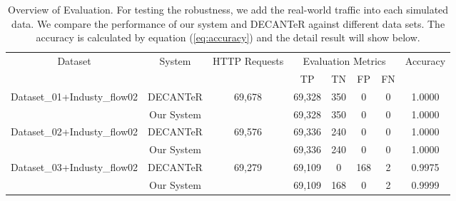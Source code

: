 \begin{table*}[!h]
\centering
\caption{Overview of Evaluation.
For testing the robustness, we add the real-world traffic into each simulated data. We compare the performance of our system and DECANTeR\cite{bortolameotti2017decanter} against different data sets. The accuracy is calculated by equation (\ref{eq:accuracy}) and the detail result will show below.}
\label{tbl:db_03}
\begin{tabular}{|c|c|c|c|c|c|c|c|}
\hline\hline
\multirow{2}{*}{Dataset}     & \multirow{2}{*}{System} & \multirow{2}{*}{HTTP Requests} & \multicolumn{4}{c|}{Evaluation Metrics} & \multirow{2}{*}{Accuracy} \\ \cline{4-7}
                             &                         &                                & TP       & TN       & FP       & FN     &                           \\ \hline
\multirow{2}{*}{Dataset\_01+Industy\_flow02} & DECANTeR \cite{bortolameotti2017decanter}                & \multirow{2}{*}{69,678}          & 69,328      & 350      & 0       & 0      & 1.0000                     \\ \cline{2-2} \cline{4-8} 
                             & Our System              &                                & 69,328       & 350      & 0       & 0      & 1.0000                    \\ \hline
\multirow{2}{*}{Dataset\_02+Industy\_flow02} & DECANTeR \cite{bortolameotti2017decanter}                & \multirow{2}{*}{69,576}          & 69,336      & 240      & 0       & 0      & 1.0000                     \\ \cline{2-2} \cline{4-8} 
                             & Our System              &                                & 69,336     & 240      & 0       & 0      & 1.0000                     \\ \hline
\multirow{2}{*}{Dataset\_03+Industy\_flow02} & DECANTeR \cite{bortolameotti2017decanter}                & \multirow{2}{*}{69,279}          & 69,109      & 0        & 168      & 2      & 0.9975                    \\ \cline{2-2} \cline{4-8} 
                             & Our System              &                                & 69,109      & 168      & 0        & 2      & 0.9999                    \\ \hline\hline
\end{tabular}
\end{table*}



